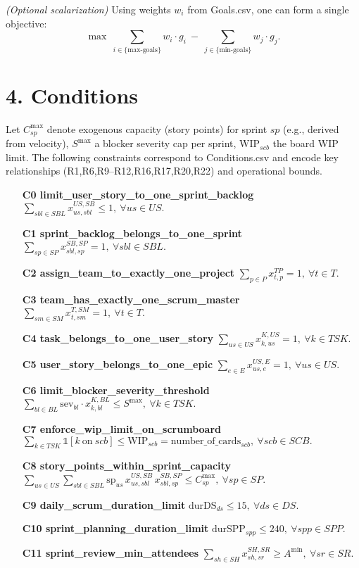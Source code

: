 \documentclass[11pt,a4paper]{article}
\begin{document}
\noindent \textit{(Optional scalarization)} Using weights $w_i$ from Goals.csv, one can form a single objective:
\[
\max \ \sum_{i \in \{\text{max-goals}\}} w_i \cdot g_i \ - \ \sum_{j \in \{\text{min-goals}\}} w_j \cdot g_j .
\]

\section{4. Conditions}
Let $C^{\max}_{sp}$ denote exogenous capacity (story points) for sprint $sp$ (e.g., derived from velocity), $S^{\max}$ a blocker severity cap per sprint, $\text{WIP}_{scb}$ the board WIP limit. The following constraints correspond to Conditions.csv and encode key relationships (R1,R6,R9--R12,R16,R17,R20,R22) and operational bounds.

\begin{itemize}
  \item[\textbf{C0 limit\_user\_story\_to\_one\_sprint\_backlog}] $\displaystyle \sum_{sbl\in SBL} x^{US,SB}_{us,sbl} \le 1,\ \forall us\in US.$
  \item[\textbf{C1 sprint\_backlog\_belongs\_to\_one\_sprint}] $\displaystyle \sum_{sp\in SP} x^{SB,SP}_{sbl,sp} = 1,\ \forall sbl\in SBL.$
  \item[\textbf{C2 assign\_team\_to\_exactly\_one\_project}] $\displaystyle \sum_{p\in P} x^{TP}_{t,p} = 1,\ \forall t\in T.$
  \item[\textbf{C3 team\_has\_exactly\_one\_scrum\_master}] $\displaystyle \sum_{sm\in SM} x^{T,SM}_{t,sm} = 1,\ \forall t\in T.$
  \item[\textbf{C4 task\_belongs\_to\_one\_user\_story}] $\displaystyle \sum_{us\in US} x^{K,US}_{k,us} = 1,\ \forall k\in TSK.$
  \item[\textbf{C5 user\_story\_belongs\_to\_one\_epic}] $\displaystyle \sum_{e\in E} x^{US,E}_{us,e} = 1,\ \forall us\in US.$
  \item[\textbf{C6 limit\_blocker\_severity\_threshold}] $\displaystyle \sum_{bl\in BL} \text{sev}_{bl}\cdot x^{K,BL}_{k,bl} \le S^{\max},\ \forall k\in TSK.$
  \item[\textbf{C7 enforce\_wip\_limit\_on\_scrumboard}] $\displaystyle \sum_{k\in TSK} \mathbb{1}[k\ \text{on}\ scb] \le \text{WIP}_{scb}=\text{number\_of\_cards}_{scb},\ \forall scb\in SCB.$
  \item[\textbf{C8 story\_points\_within\_sprint\_capacity}] $\displaystyle \sum_{us\in US}\sum_{sbl\in SBL} \text{sp}_{us}\, x^{US,SB}_{us,sbl}\, x^{SB,SP}_{sbl,sp} \le C^{\max}_{sp},\ \forall sp\in SP.$
  \item[\textbf{C9 daily\_scrum\_duration\_limit}] $\displaystyle \text{durDS}_{ds} \le 15,\ \forall ds\in DS.$
  \item[\textbf{C10 sprint\_planning\_duration\_limit}] $\displaystyle \text{durSPP}_{spp} \le 240,\ \forall spp\in SPP.$
  \item[\textbf{C11 sprint\_review\_min\_attendees}] $\displaystyle \sum_{sh\in SH} x^{SH,SR}_{sh,sr} \ge A^{\min},\ \forall sr\in SR.$
\end{itemize}
\end{document}
